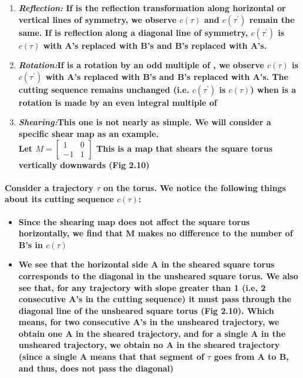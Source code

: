 \documentclass{report}
\begin{document}
\begin{enumerate}
\item \textbf{\emph{Reflection:} If  is the reflection transformation along horizontal or vertical lines of symmetry, we observe $c(\tau)$ and $c(\tau^{'})$ remain the same. If  is reflection along a diagonal line of symmetry, $c(\tau^{'})$ is $c(\tau)$ with A’s replaced with B’s and B’s replaced with A’s.}
\item \textbf{\emph{Rotation:}If  is a rotation by an odd multiple of , we observe $c(\tau)$ is $c(\tau^{'})$ with A’s replaced with B’s and B’s replaced with A’s. The cutting sequence remains unchanged (i.e. $c(\tau^{'})$ is $c(\tau)$) when  is a rotation is made by an even integral multiple of }
\item \textbf{\emph{Shearing:}This one is not nearly as simple. We will consider a specific shear map as an example. \\
Let $M = \begin{bmatrix} 1&0\\-1&1 \end{bmatrix}$ This is a map that shears the square torus vertically downwards (Fig 2.10) }
\end{enumerate}


\paragraph{Consider a trajectory $\tau$ on the torus. We notice the following things about its cutting sequence $c(\tau)$:}
\begin{itemize}
\item \textbf{Since the shearing map does not affect the square torus horizontally, we find that M makes no difference to the number of B’s in $c(\tau)$}
\item \textbf{We see that the horizontal side A in the sheared square torus corresponds to the diagonal in the unsheared square torus. We also see that, for any trajectory with slope greater than 1 (i.e, 2 consecutive A’s in the cutting sequence) it must pass through the diagonal line of the unsheared square torus (Fig 2.10). Which means, for two consecutive A’s in the unsheared trajectory, we obtain one A in the sheared trajectory, and for a single A in the unsheared trajectory, we obtain no A in the sheared trajectory (since a single A means that that segment of $\tau$ goes from A to B, and thus, does not pass the diagonal)}
\end{itemize}
\end{document}
